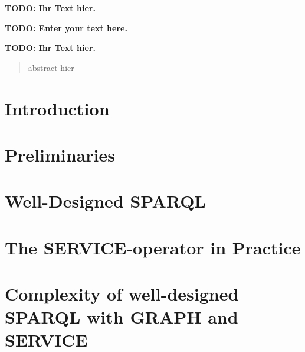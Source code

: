 \documentclass[draft,final]{vutinfth} %
\newcommand{\todo}[1]{{\color{red}\textbf{TODO: {#1}}}} %
\begin{document}
\frontmatter %

\addstatementpage

\begin{danksagung*}
\todo{Ihr Text hier.}
\end{danksagung*}

\begin{acknowledgements*}
\todo{Enter your text here.}
\end{acknowledgements*}

\begin{kurzfassung}
\todo{Ihr Text hier.}
\end{kurzfassung}

\begin{abstract}
	abstract hier
\end{abstract}


\tableofcontents %

\mainmatter

\chapter{Introduction}

\chapter{Preliminaries}



\chapter{Well-Designed SPARQL}


\chapter{The SERVICE-operator in Practice}\label{chapter:serviceeval}


\chapter{Complexity of well-designed SPARQL with GRAPH and SERVICE}

\end{document}
